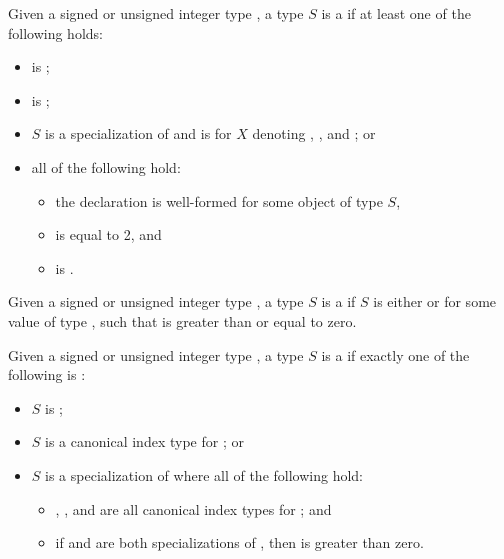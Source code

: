 \pnum
Given a signed or unsigned integer type ,
a type $S$ is a
if at least one of the following holds:
\begin{itemize}
\item
   is ;
\item
   is ;
\item
  $S$ is a specialization of  and
   is  for $X$ denoting
  ,
  , and
  ; or
\item
  all of the following hold:
  \begin{itemize}
  \item
    the declaration  is well-formed
    for some object  of type $S$,
  \item
     is equal to 2, and
  \item
     is .
  \end{itemize}
\end{itemize}

\pnum
Given a signed or unsigned integer type ,
a type $S$ is a
if $S$ is either  or 
for some value  of type ,
such that  is greater than or equal to zero.

\pnum
Given a signed or unsigned integer type ,
a type $S$ is a
if exactly one of the following is :
\begin{itemize}
\item
  $S$ is ;
\item
  $S$ is a canonical  index type for ; or
\item
  $S$ is a specialization of 
  where all of the following hold:
  \begin{itemize}
  \item
    , , and 
    are all canonical  index types for ; and
  \item
    if  and 
    are both specializations of ,
    then  is greater than zero.
  \end{itemize}
\end{itemize}

